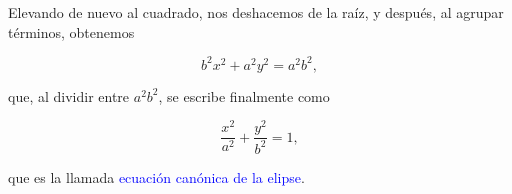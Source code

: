 \documentclass{article}
\theoremstyle{definicion}
\theoremstyle{definition}             %
\theoremstyle{definition}             %
\theoremstyle{definition}
\theoremstyle{definition}
\theoremstyle{observacion}
\theoremstyle{definition}
\theoremstyle{plain}
\theoremstyle{definition}
\theoremstyle{afirmacion}
\theoremstyle{notation}
\theoremstyle{definition}
\begin{document}
    Elevando de nuevo al cuadrado, nos deshacemos de la raíz, y después, al agrupar términos, obtenemos

    \begin{equation*}
        b^{2}x^{2} + a^{2}y^{2} = a^{2}b^{2},
    \end{equation*}

    que, al dividir entre \(a^{2}b^{2}\), se escribe finalmente como

    \begin{equation*}
        \dfrac{x^{2}}{a^{2}} + \dfrac{y^{2}}{b^{2}} = 1,
    \end{equation*}

    que es la llamada \textcolor{blue}{ecuación canónica de la elipse}.
\end{document}
